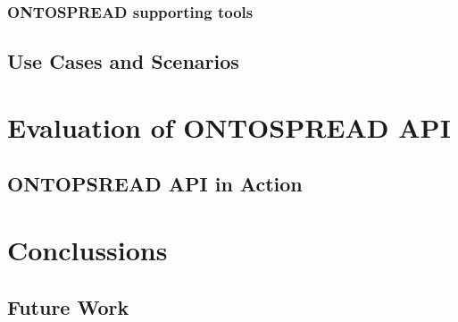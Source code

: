 \documentclass{llncs}
\begin{document}
% 
% 


\subsubsection{ONTOSPREAD supporting tools}
\subsection{Use Cases and Scenarios}
\section{Evaluation of ONTOSPREAD API}
\subsection{ONTOPSREAD API in Action}
\section{Conclussions}
\subsection{Future Work}
\end{document}

